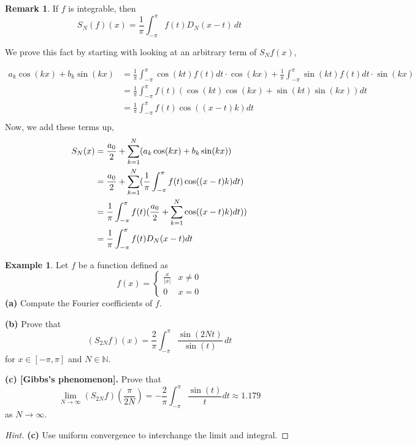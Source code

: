 \documentclass[12pt]{amsart}
\theoremstyle{definition}
\newtheorem{example}[theorem]{Example}
\newtheorem{remark}[theorem]{Remark}
\begin{document}
     \begin{remark}
         If \(f\) is integrable, then
    \[
    S_N(f)(x) = \frac{1}{\pi}\int_{-\pi}^{\pi}f(t)D_N(x-t)\,dt
    \]
     \end{remark}


        We prove this fact by starting with looking at an arbitrary term of $S_Nf(x)$,

        \begin{align*}
            a_k\cos(kx) + b_k\sin(kx) &= \frac{1}{\pi}\int_{-\pi}^{\pi}\cos(kt)f(t)dt \cdot \cos(kx) + \frac{1}{\pi}\int_{-\pi}^{\pi}\sin(kt)f(t)dt \cdot \sin(kx)\\
        &= \frac{1}{\pi}\int_{-\pi}^{\pi}f(t)(\cos(kt)\cos(kx) + \sin(kt)\sin(kx))dt\\
        &= \frac{1}{\pi}\int_{-\pi}^{\pi}f(t)\cos((x-t)k)dt\\
        \end{align*}
        Now, we add these terms up,
        \begin{align*}
            S_N(x) &=\frac{a_0}{2} + \sum_{k=1}^{N} (a_k\cos(kx) + b_k\sin(kx))\\
            &= \frac{a_0}{2} + \sum_{k=1}^{N}(\frac{1}{\pi}\int_{-\pi}^{\pi}f(t)\cos((x-t)k)dt) \\
            &= \frac{1}{\pi}\int_{-\pi}^{\pi}f(t) (\frac{a_0}{2} + \sum_{k=1}^{N}\cos((x-t)k)dt)) \\
            &= \frac{1}{\pi}\int_{-\pi}^{\pi}f(t)D_N(x-t)dt \qedhere
        \end{align*}

     \begin{example}
     Let \(f\) be a function defined as
    \[
    f(x) = \begin{cases}
        \frac{x}{|x|} & x \neq 0\\
        0             & x = 0
    \end{cases}
    \]
    \textbf{(a)} Compute the Fourier coefficients of $f$.

    \textbf{(b)} Prove that
    \[
    (S_{2N} f)(x) = \frac{2}{\pi} \int_{-\pi}^{\pi} \frac{\sin(2Nt)}{\sin(t)} \,dt
    \]
    for $x \in [-\pi,\pi]$ and $N \in \mathbb{N}$.

    \textbf{(c) [Gibbs's phenomenon].} Prove that
    \[
    \lim_{N \to \infty}(S_{2N} f)(\frac{\pi}{2N}) = -\frac{2}{\pi}\int_{-\pi}^{\pi} \frac{\sin(t)}{t} dt \approx 1.179
    \]
    as $N \to \infty$.
     \end{example}


    \begin{proof}[Hint]
        \textbf{(c)} Use uniform convergence to interchange the limit and integral.
    \end{proof}
\end{document}
